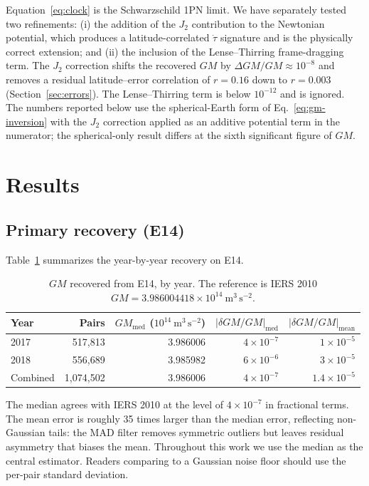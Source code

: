 \documentclass[11pt,a4paper]{article}
\begin{document}
Equation~\eqref{eq:clock} is the Schwarzschild 1PN limit. We have separately tested two refinements: (i) the addition of the $J_2$ contribution to the Newtonian potential, which produces a latitude-correlated $\dot\tau$ signature and is the physically correct extension; and (ii) the inclusion of the Lense--Thirring frame-dragging term. The $J_2$ correction shifts the recovered $GM$ by $\Delta GM/GM \approx 10^{-8}$ and removes a residual latitude--error correlation of $r=0.16$ down to $r=0.003$ (Section~\ref{sec:errors}). The Lense--Thirring term is below $10^{-12}$ and is ignored. The numbers reported below use the spherical-Earth form of Eq.~\eqref{eq:gm-inversion} with the $J_2$ correction applied as an additive potential term in the numerator; the spherical-only result differs at the sixth significant figure of $GM$.

\section{Results}

\subsection{Primary recovery (E14)}

Table~\ref{tab:e14-primary} summarizes the year-by-year recovery on E14.

\begin{table}[h]
    \centering
    \caption{$GM$ recovered from E14, by year. The reference is IERS 2010 $GM = 3.986004418 \times 10^{14}~\mathrm{m^3\,s^{-2}}$.}
    \label{tab:e14-primary}
    \begin{tabular}{lrrrr}
        \toprule
        Year & Pairs & $GM_\text{med}$ ($10^{14}~\mathrm{m^3\,s^{-2}}$) & $|\delta GM/GM|_\text{med}$ & $|\delta GM/GM|_\text{mean}$ \\
        \midrule
        2017 & 517{,}813 & 3.986006 & $4 \times 10^{-7}$ & $1 \times 10^{-5}$ \\
        2018 & 556{,}689 & 3.985982 & $6 \times 10^{-6}$ & $3 \times 10^{-5}$ \\
        \midrule
        Combined & 1{,}074{,}502 & 3.986006 & $4 \times 10^{-7}$ & $1.4 \times 10^{-5}$ \\
        \bottomrule
    \end{tabular}
\end{table}

The median agrees with IERS 2010 at the level of $4 \times 10^{-7}$ in fractional terms. The mean error is roughly 35 times larger than the median error, reflecting non-Gaussian tails: the MAD filter removes symmetric outliers but leaves residual asymmetry that biases the mean. Throughout this work we use the median as the central estimator. Readers comparing to a Gaussian noise floor should use the per-pair standard deviation.
\end{document}
